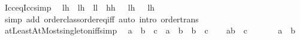 \begin{isabellebody}
\ Icc{\isacharunderscore}{\kern0pt}eq{\isacharunderscore}{\kern0pt}Icc{\isacharbrackleft}{\kern0pt}simp{\isacharbrackright}{\kern0pt}{\isacharcolon}{\kern0pt}\isanewline
\ \ {\isachardoublequoteopen}{\isacharbraceleft}{\kern0pt}l{\isachardot}{\kern0pt}{\isachardot}{\kern0pt}h{\isacharbraceright}{\kern0pt}\ {\isacharequal}{\kern0pt}\ {\isacharbraceleft}{\kern0pt}l{\isacharprime}{\kern0pt}{\isachardot}{\kern0pt}{\isachardot}{\kern0pt}h{\isacharprime}{\kern0pt}{\isacharbraceright}{\kern0pt}\ {\isacharequal}{\kern0pt}\ {\isacharparenleft}{\kern0pt}l{\isacharequal}{\kern0pt}l{\isacharprime}{\kern0pt}\ {\isasymand}\ h{\isacharequal}{\kern0pt}h{\isacharprime}{\kern0pt}\ {\isasymor}\ {\isasymnot}\ l{\isasymle}h\ {\isasymand}\ {\isasymnot}\ l{\isacharprime}{\kern0pt}{\isasymle}h{\isacharprime}{\kern0pt}{\isacharparenright}{\kern0pt}{\isachardoublequoteclose}\isanewline
%
\isadelimproof
\ \ %
\endisadelimproof
%
\isatagproof
{}\isamarkupfalse%
\ {\isacharparenleft}{\kern0pt}simp\ add{\isacharcolon}{\kern0pt}\ order{\isacharunderscore}{\kern0pt}class{\isachardot}{\kern0pt}order{\isachardot}{\kern0pt}eq{\isacharunderscore}{\kern0pt}iff{\isacharparenright}{\kern0pt}\ {\isacharparenleft}{\kern0pt}auto\ intro{\isacharcolon}{\kern0pt}\ order{\isacharunderscore}{\kern0pt}trans{\isacharparenright}{\kern0pt}%
\endisatagproof
{\isafoldproof}%
%
\isadelimproof
\isanewline
%
\endisadelimproof
\isanewline
{}\isamarkupfalse%
\ atLeastAtMost{\isacharunderscore}{\kern0pt}singleton{\isacharunderscore}{\kern0pt}iff{\isacharbrackleft}{\kern0pt}simp{\isacharbrackright}{\kern0pt}{\isacharcolon}{\kern0pt}\isanewline
\ \ {\isachardoublequoteopen}{\isacharbraceleft}{\kern0pt}a\ {\isachardot}{\kern0pt}{\isachardot}{\kern0pt}\ b{\isacharbraceright}{\kern0pt}\ {\isacharequal}{\kern0pt}\ {\isacharbraceleft}{\kern0pt}c{\isacharbraceright}{\kern0pt}\ {\isasymlongleftrightarrow}\ a\ {\isacharequal}{\kern0pt}\ b\ {\isasymand}\ b\ {\isacharequal}{\kern0pt}\ c{\isachardoublequoteclose}\isanewline
%
\isadelimproof
%
\endisadelimproof
%
\isatagproof
{}\isamarkupfalse%
\isanewline
\ \ \isamarkupfalse%
\ {\isachardoublequoteopen}{\isacharbraceleft}{\kern0pt}a{\isachardot}{\kern0pt}{\isachardot}{\kern0pt}b{\isacharbraceright}{\kern0pt}\ {\isacharequal}{\kern0pt}\ {\isacharbraceleft}{\kern0pt}c{\isacharbraceright}{\kern0pt}{\isachardoublequoteclose}\isanewline
\ \ \isamarkupfalse%
\ {\isacharasterisk}{\kern0pt}{\isacharcolon}{\kern0pt}\ {\isachardoublequoteopen}{\isasymnot}\ {\isacharparenleft}{\kern0pt}{\isasymnot}\ a\ {\isasymle}\ b{\isacharparenright}{\kern0pt}{\isachardoublequoteclose}\ \isamarkupfalse%

\end{isabellebody}
